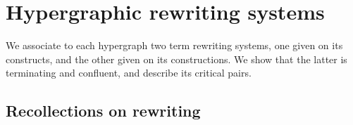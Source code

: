 
\section{Hypergraphic rewriting systems} 
\label{s:rewriting}

We associate to each hypergraph two term rewriting systems, one given on its constructs, and the other given on its constructions.
We show that the latter is terminating and confluent, and describe its critical pairs. 


\subsection{Recollections on rewriting} \label{recollection-section}

